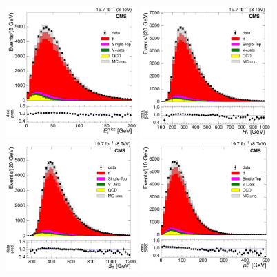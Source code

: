 \begin{figure}[hbtp]
    \centering
     \includegraphics[width=0.45\textwidth]{Chapters/04_Analysis/04b_XSections/images/control_plots/before_fit/8TeV/EPlusJets_patType1CorrectedPFMet_2orMoreBtags_with_ratio.pdf}\hfill
     \includegraphics[width=0.45\textwidth]{Chapters/04_Analysis/04b_XSections/images/control_plots/before_fit/8TeV/EPlusJets_HT_2orMoreBtags_with_ratio.pdf}\\
     \includegraphics[width=0.45\textwidth]{Chapters/04_Analysis/04b_XSections/images/control_plots/before_fit/8TeV/EPlusJets_patType1CorrectedPFMet_ST_2orMoreBtags_with_ratio.pdf}\hfill
     \includegraphics[width=0.45\textwidth]{Chapters/04_Analysis/04b_XSections/images/control_plots/before_fit/8TeV/EPlusJets_patType1CorrectedPFMet_WPT_2orMoreBtags_with_ratio.pdf}\\

\end{figure}
